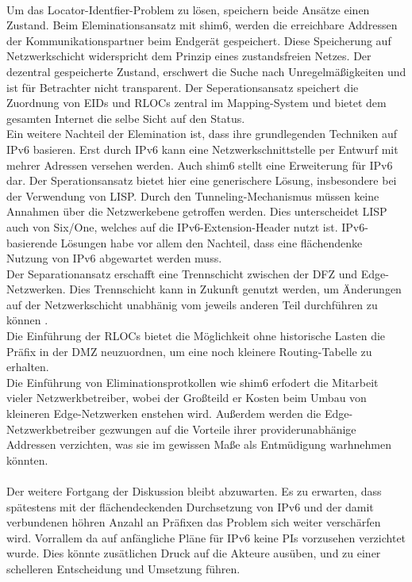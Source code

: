 \paragraph{}
Um das Locator-Identfier-Problem zu lösen, speichern beide Ansätze einen Zustand. Beim Eleminationsansatz mit shim6, werden die erreichbare Addressen der Kommunikationspartner beim Endgerät gespeichert. Diese Speicherung auf Netzwerkschicht widerspricht dem Prinzip eines zustandsfreien Netzes. Der dezentral gespeicherte Zustand, erschwert die Suche nach Unregelmäßigkeiten und ist für Betrachter nicht transparent. Der Seperationsansatz speichert die Zuordnung von EIDs und RLOCs zentral im Mapping-System und bietet dem gesamten Internet die selbe Sicht auf den Status. \\
Ein weitere Nachteil der Elemination ist, dass ihre grundlegenden Techniken auf IPv6 basieren. Erst durch IPv6 kann eine Netzwerkschnittstelle per Entwurf mit mehrer Adressen versehen werden. Auch shim6 stellt eine Erweiterung für IPv6 dar. Der Sperationsansatz bietet hier eine generischere Lösung, insbesondere bei der Verwendung von LISP. Durch den Tunneling-Mechanismus müssen keine Annahmen über die Netzwerkebene getroffen werden. Dies unterscheidet LISP auch von Six/One, welches auf die IPv6-Extension-Header nutzt ist. IPv6-basierende Lösungen habe vor allem den Nachteil, dass eine flächendenke Nutzung von IPv6 abgewartet werden muss. \\
Der Separationansatz erschafft eine Trennschicht zwischen der DFZ und Edge-Netzwerken. Dies Trennschicht kann in Zukunft genutzt werden, um Änderungen auf der Netzwerkschicht unabhänig vom jeweils anderen Teil durchführen zu können \cite{jen:2008:start}. \\
Die Einführung der RLOCs bietet die Möglichkeit ohne historische Lasten die Präfix in der DMZ neuzuordnen, um eine noch kleinere Routing-Tabelle zu erhalten. \\
Die Einführung von Eliminationsprotkollen wie shim6 erfodert die Mitarbeit vieler Netzwerkbetreiber, wobei der Großteild er Kosten beim Umbau von kleineren Edge-Netzwerken enstehen wird. Außerdem werden die Edge-Netzwerkbetreiber gezwungen auf die Vorteile ihrer providerunabhänige Addressen verzichten, was sie im gewissen Maße als Entmüdigung warhnehmen könnten.

\paragraph{}
Der weitere Fortgang der Diskussion bleibt abzuwarten. Es zu erwarten, dass spätestens mit der flächendeckenden Durchsetzung von IPv6 und der damit verbundenen höhren Anzahl an Präfixen das Problem sich weiter verschärfen wird. Vorrallem da auf anfängliche Pläne für IPv6 keine PIs vorzusehen verzichtet wurde. Dies könnte zusätlichen Druck auf die Akteure ausüben, und zu einer schelleren Entscheidung und Umsetzung führen.
